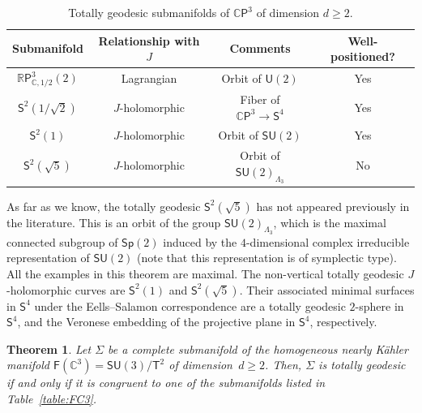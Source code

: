 \documentclass[11pt,a4paper,final]{amsart}
\newcommand{\s}{\mathsf}
\newcommand{\R}{\mathbb{R}}
\newcommand{\C}{\mathbb{C}}
\newtheorem{thmx}{Theorem}
\theoremstyle{definition}
\renewcommand{\arraystretch}{1.2}
\begin{document}
\begin{table}[h!]
	\centering
	\caption{Totally geodesic submanifolds of $\C\mathsf{P}^{3}$ of dimension $d\ge 2$.}
	\label{table:CP3}
	\renewcommand{\arraystretch}{1.2}
	\begin{tabular}{cccc}
		\toprule 
		Submanifold & Relationship with $J$ & Comments & Well-positioned? \\
		\toprule
		$\R\mathsf{P}^{3}_{\C,1/2}(2)$ & Lagrangian & Orbit of $\mathsf{U}(2)$ & Yes\\
		\hline
		$\mathsf{S}^{2}\left(1/\sqrt{2}\right)$ & $J$-holomorphic & Fiber of $\C\mathsf{P}^{3}\to\mathsf{S}^{4}$ & Yes \\
		\hline
		$\mathsf{S}^{2}(1)$ & $J$-holomorphic & Orbit of $\mathsf{SU}(2)$ & Yes \\
		\hline
		$\mathsf{S}^{2}\left(\sqrt{5}\right)$ & $J$-holomorphic & Orbit of $\mathsf{SU}(2)_{\Lambda_{3}}$ & No \\
		\bottomrule
	\end{tabular}
\end{table}
As far as we know, the totally geodesic $\s{S}^2(\sqrt{5})$ has not appeared previously in the literature.
This is an orbit of the group $\s{SU}(2)_{\Lambda_{3}}$, which is the maximal connected subgroup of $\s{Sp}(2)$ induced by the $4$-dimensional complex irreducible representation of $\s{SU}(2)$ (note that this representation is of symplectic type).
All the examples in this theorem are maximal.
The non-vertical totally geodesic $J$-holomorphic curves are $\s{S}^2(1)$ and $\s{S}^2(\sqrt{5})$. Their associated minimal surfaces in $\s{S}^4$  under the Eells--Salamon correspondence are a totally geodesic $2$-sphere in $\s{S}^4$, and the Veronese embedding of the projective plane in $\s{S}^4$, respectively.

\begin{thmx}\label{th:tg-fc3-classification}
	Let $\Sigma$ be a complete submanifold of the homogeneous nearly Kähler manifold $\s{F}(\C^3)=\s{SU}(3)/\s{T}^2$ of dimension~$d\ge 2$. Then, $\Sigma$ is totally geodesic if and only if it is congruent to one of the submanifolds listed in Table~\ref{table:FC3}.
\end{thmx}		
\end{document}
